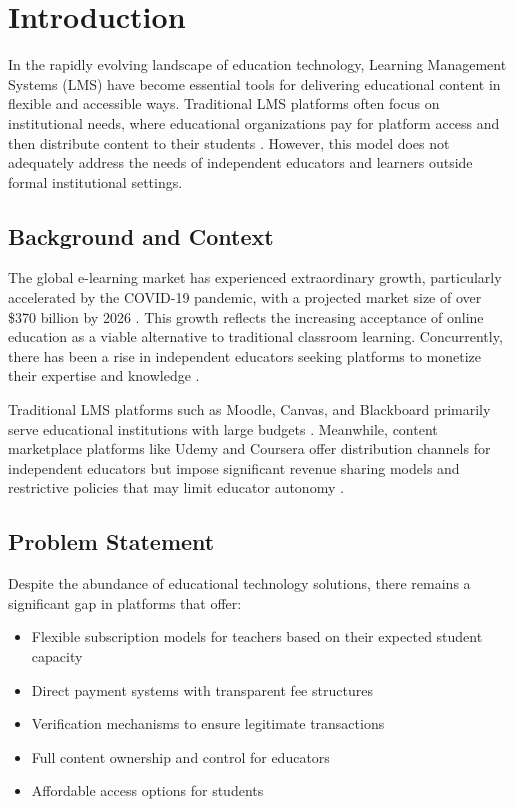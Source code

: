 \section{Introduction}

In the rapidly evolving landscape of education technology, Learning Management Systems (LMS) have become essential tools for delivering educational content in flexible and accessible ways. Traditional LMS platforms often focus on institutional needs, where educational organizations pay for platform access and then distribute content to their students \cite{aldiab2019}. However, this model does not adequately address the needs of independent educators and learners outside formal institutional settings.

\subsection{Background and Context}

The global e-learning market has experienced extraordinary growth, particularly accelerated by the COVID-19 pandemic, with a projected market size of over \$370 billion by 2026 \cite{markets2021}. This growth reflects the increasing acceptance of online education as a viable alternative to traditional classroom learning. Concurrently, there has been a rise in independent educators seeking platforms to monetize their expertise and knowledge \cite{kim2020}.

Traditional LMS platforms such as Moodle, Canvas, and Blackboard primarily serve educational institutions with large budgets \cite{turnbull2019}. Meanwhile, content marketplace platforms like Udemy and Coursera offer distribution channels for independent educators but impose significant revenue sharing models and restrictive policies that may limit educator autonomy \cite{deng2019}.

\subsection{Problem Statement}

Despite the abundance of educational technology solutions, there remains a significant gap in platforms that offer:

\begin{itemize}
    \item Flexible subscription models for teachers based on their expected student capacity
    \item Direct payment systems with transparent fee structures
    \item Verification mechanisms to ensure legitimate transactions
    \item Full content ownership and control for educators
    \item Affordable access options for students
\end{itemize}

